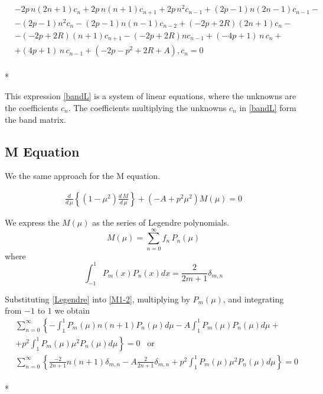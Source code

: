 \begin{equation}\label{bandL}
\begin{split}
& -2p\,n(2n+1)c_n  + 2p\,n(n+1)c_{n+1}+2p\,n^2c_{n-1} + (2p-1)n(2n-1)c_{n-1}-  \\[.8em]
& - (2p-1)n^2c_n-(2p-1)n(n-1)c_{n-2} +(-2p+2R)(2n+1)c_n - \\[.8em]
& - (-2p+2R)(n+1)c_{n+1} - (-2p+2R)n c_{n-1} + (-4p + 1)\,n\,c_n +  \\[.8em]
&  + (4p+1)\,n\,c_{n-1} + (-2p - p^2 + 2R + A),c_ n = 0 
\end{split} 
\end{equation}\\*

This expression \eqref{bandL} is  a system of linear equations, where the unknowns are the coefficients $ c_n $. The coefficients multiplying the unknowns $ c_n $ in \eqref{bandL} form the band matrix.


\subsection{M  Equation}

We the same approach for the M equation.

\begin{equation}\label{M1-2}
\begin{split}
\frac{d}{d\,\mu}\left\{\left(1 - \mu^2\right)\frac{d\,M}{d\,\mu} \right\}  + \left( - A + p^2\mu^2   \right)M(\mu) = 0
\end{split}
\end{equation}

We express the $ M(\mu) $ as the series of Legendre polynomials.
\begin{equation}\label{Legendre}
M(\mu) = \sum_{n=0}^{\infty}{f_n\,P_n(\mu)}
\end{equation}
where 
\begin{equation}\label{LInt}
\int_{-1}^{1}{P_m(x)P_n(x)dx} = \frac{2}{2m+1}\delta_{m,n}
\end{equation}

Substituting \eqref{Legendre} into \eqref{M1-2}, multiplying by $ P_m(\mu) $, and integrating from $ -1 $ to $ 1 $ we obtain
\begin{equation}\label{3}
\begin{split}
& \sum_{n=0}^{\infty}\left\{-\int_{1}^{1}{P_m(\mu)n(n+1)P_n(\mu)d\mu } - A \int_{1}^{1}{P_m(\mu)P_n(\mu)d\mu } + \right. \\[.8em]
& + \left.p^2\int_{1}^{1}{P_m(\mu)\mu^2P_n(\mu)d\mu } \right\} = 0\,\,\,\text{    or } \\[.8em]
& \sum_{n=0}^{\infty}\left\{\frac{-2}{2n+1}n(n+1)\delta_{m,n} - A\frac{2}{2n+1}\delta_{m,n} + p^2\int_{1}^{1}{P_m(\mu)\mu^2P_n(\mu)d\mu } \right\}
= 0
\end{split}
\end{equation}\\*

